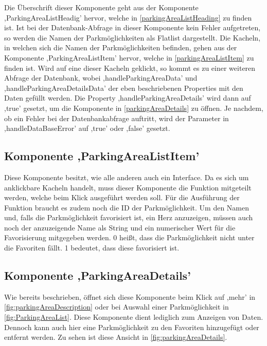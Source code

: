Die Überschrift dieser Komponente geht aus der Komponente ,ParkingAreaListHeadig' hervor, welche in \autoref{parkingAreaListHeading} zu finden ist. Ist bei der Datenbank-Abfrage in dieser Komponente kein Fehler aufgetreten, so werden die Namen der Parkmöglichkeiten als Flatlist dargestellt. Die Kacheln, in welchen sich die Namen der Parkmöglichkeiten befinden, gehen aus der Komponente ,ParkingAreaListItem' hervor, welche in \autoref{parkingAreaListItem} zu finden ist. Wird auf eine dieser Kacheln geklickt, so kommt es zu einer weiteren Abfrage der Datenbank, wobei ,handleParkingAreaData' und ,handleParkingAreaDetailsData' der eben beschriebenen Properties mit den Daten gefüllt werden. Die Property ,handleParkingAreaDetails' wird dann auf ,true' gesetzt, um die Komponente in \autoref{parkingAreaDetails} zu öffnen. Je nachdem, ob ein Fehler bei der Datenbankabfrage auftritt, wird der Parameter in ,handleDataBaseError' auf ,true' oder ,false' gesetzt.

\subsection{Komponente ,ParkingAreaListItem'}
\label{parkingAreaListItem}
Diese Komponente besitzt, wie alle anderen auch ein Interface. Da es sich um anklickbare Kacheln handelt, muss dieser Komponente die Funktion mitgeteilt werden, welche beim Klick ausgeführt werden soll. Für die Ausführung der Funktion braucht es zudem noch die ID der Parkmöglichkeit. Um den Namen und, falls die Parkmöglichkeit favorisiert ist, ein Herz anzuzeigen, müssen auch noch der anzuzeigende Name als String und ein numerischer Wert für die Favorisierung mitgegeben werden. 0 heißt, dass die Parkmöglichkeit nicht unter die Favoriten fällt. 1 bedeutet, dass diese favorisiert ist.

\subsection{Komponente ,ParkingAreaDetails'}
\label{parkingAreaDetails}
Wie bereits beschrieben, öffnet sich diese Komponente beim Klick auf ,mehr' in \autoref{fig:parkingAreaDescription} oder bei Auswahl einer Parkmöglichkeit in \autoref{fig:ParkingAreaList}. Diese Komponente dient lediglich zum Anzeigen von Daten. Dennoch kann auch hier eine Parkmöglichkeit zu den Favoriten hinzugefügt oder entfernt werden. Zu sehen ist diese Ansicht in \autoref{fig:parkingAreaDetails}.

